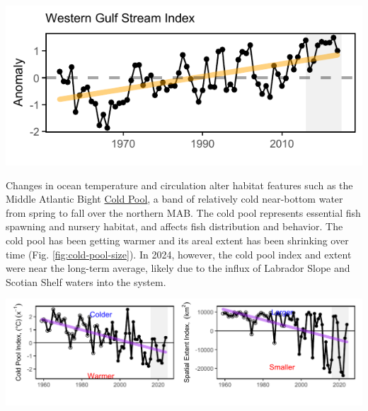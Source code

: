 \documentclass[
  10pt,
]{article}
\let\origfigure\figure
\let\endorigfigure\endfigure
\renewenvironment{figure}[1][2] {
    \expandafter\origfigure\expandafter[H]
} {
    \endorigfigure
}
\begin{document}
\begin{figure}

{\centering \includegraphics{midatlantic_files/figure-latex/GSI-1} 

}

\caption{Index representing changes in the location of the western (between 64 and 55 degrees W) Gulf Stream north wall (black). Positive values represent a more northerly Gulf Stream position, with increasing trend (orange).}\label{fig:GSI}
\end{figure}

Changes in ocean temperature and circulation alter habitat features such as the Middle Atlantic Bight \href{https://noaa-edab.github.io/catalog/cold_pool.html}{Cold Pool}, a band of relatively cold near-bottom water from spring to fall over the northern MAB. The cold pool represents essential fish spawning and nursery habitat, and affects fish distribution and behavior. The cold pool has been getting warmer and its areal extent has been shrinking over time (Fig. \ref{fig:cold-pool-size}). In 2024, however, the cold pool index and extent were near the long-term average, likely due to the influx of Labrador Slope and Scotian Shelf waters into the system.

\begin{figure}

{\centering \includegraphics{midatlantic_files/figure-latex/cold-pool-size-1} 

}

\caption{Seasonal cold pool mean temperature (left) and spatial extent index (right), based on bias-corrected ROMS-NWA (open circles) and GLORYS (closed circles), with declining trends (purple).}\label{fig:cold-pool-size}
\end{figure}
\end{document}
